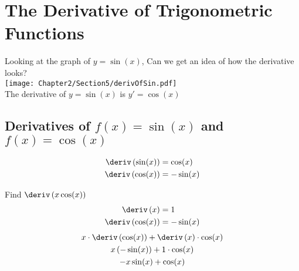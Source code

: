 
\section{The Derivative of Trigonometric Functions}
Looking at the graph of $y=\sin(x)$, Can we get an idea of how the derivative looks? \\
\texttt{[image: Chapter2/Section5/derivOfSin.pdf]}\\
The derivative of $y = \sin(x)$ is $y' = \cos(x)$
\subsection{Derivatives of \texorpdfstring{$f(x) = \sin(x)$}{f(x) = sin(x)} and \texorpdfstring{$f(x) = \cos(x)$}{f(x) = cos(x)}}
\begin{align}
    \deriv \left(\sin(x)\right) &= \cos(x) \\
    \deriv \left(\cos(x)\right) &= -\sin(x)
\end{align}
\begin{example}
    Find $\deriv \left(x\cos(x)\right)$
    \begin{align*}
        \deriv \left(x\right) &= 1 \\
        \deriv \left(\cos(x)\right) &= -\sin(x)
    \end{align*}
    \begin{gather*}
        x \cdot \deriv \left(\cos(x)\right) + \deriv \left(x\right) \cdot \cos(x) \\
        x \left(-\sin(x)\right) + 1 \cdot \cos(x) \\
        -x\sin(x) + \cos(x)
    \end{gather*}
\end{example}
